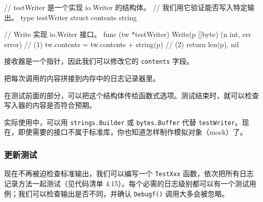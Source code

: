 \begin{gocode}[title={代码清单 4.14 \texttt{logger\_test.go}：测试辅助工具的实现}]
// testWriter 是一个实现 io.Writer 的结构体。
// 我们用它验证能否写入特定输出。
type testWriter struct {
    contents string
}

// Write 实现 io.Writer 接口。
func (tw *testWriter) Write(p []byte) (n int, err error) { // (1)
    tw.contents = tw.contents + string(p) // (2)
    return len(p), nil
}
\end{gocode}

\begin{codeannotations}
  \item 接收器是一个指针，因此我们可以修改它的 \texttt{contents} 字段。
  \item 把每次调用的内容拼接到内存中的日志记录器里。
\end{codeannotations}

在测试前面的部分，可以把这个结构体传给函数式选项。测试结束时，就可以检查写入器的内容是否符合预期。

实际使用中，可以用 \texttt{strings.Builder} 或 \texttt{bytes.Buffer} 代替 \texttt{testWriter}。现在，即使需要的接口不属于标准库，你也知道怎样制作模拟对象（mock）了。

\subsubsection*{更新测试}

现在不再被迫检查标准输出，我们可以编写一个 \texttt{TestXxx} 函数，依次把所有日志记录方法一起测试（见代码清单 4.15）。每个必需的日志级别都可以有一个测试用例；我们可以检查输出是否不同，并确认 \texttt{Debugf()} 调用大多会被忽略。

